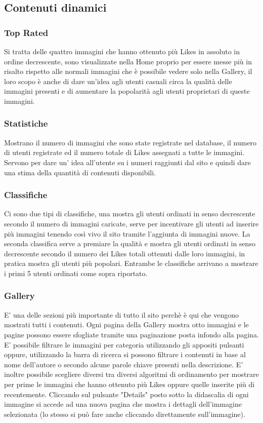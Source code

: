 \documentclass[openany, a4paper, 12pt]{report}
\begin{document}
	\subsection{Contenuti dinamici}
		\subsubsection{Top Rated}
		Si tratta delle quattro immagini che hanno ottenuto più Likes in assoluto in ordine decrescente, sono visualizzate nella Home proprio per essere messe più in risalto rispetto alle normali immagini che è possibile vedere solo nella Gallery, il loro scopo è anche di dare un'idea agli utenti casuali circa la qualità delle immagini presenti e di aumentare la popolarità agli utenti proprietari di queste immagini.

		\subsubsection{Statistiche}
		Mostrano il numero di immagini che sono state registrate nel database, il numero di utenti registrate ed il numero totale di Likes assegnati a tutte le immagini. Servono per dare un' idea all'utente su i numeri raggiunti dal sito e quindi dare una stima della quantità di contenuti disponibili.

		\subsubsection{Classifiche}
		Ci sono due tipi di classifiche, una mostra gli utenti ordinati in senso decrescente secondo il numero di immagini caricate, serve per incentivare gli utenti ad inserire più immagini tenendo così vivo il sito tramite l'aggiunta di immagini nuove. La seconda classifica serve a premiare la qualità e mostra gli utenti ordinati in senso decrescente secondo il numero dei Likes totali ottenuti dalle loro immagini, in pratica mostra gli utenti più popolari. Entrambe le classifiche arrivano a mostrare i primi 5 utenti ordinati come sopra riportato.
		
		\subsubsection{Gallery}
		E' una delle sezioni più importante di tutto il sito perchè è qui che vengono mostrati tutti i contenuti. Ogni pagina della Gallery mostra otto immagini e le pagine possono essere sfogliate tramite una paginazione posta infondo alla pagina. E' possibile filtrare le immagini per categoria utilizzando gli appositi pulsanti oppure, utilizzando la barra di ricerca si possono filtrare i contenuti in base al nome dell'autore o secondo alcune parole chiave presenti nella descrizione. E' inoltre possibile scegliere diversi tra diversi algoritmi di ordinamento per mostrare per prime le immagini che hanno ottenuto più Likes oppure quelle inserite più di recentemente. Cliccando sul pulsante "Details" posto sotto la didascalia di ogni immagine si accede ad una nuova pagina che mostra i dettagli dell'immagine selezionata (lo stesso si può fare anche cliccando direttamente sull'immagine).
		
\end{document}
